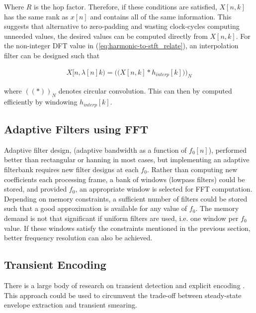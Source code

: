 \documentclass [11pt, proquest,oneside] {ganter_thesis}[2015/03/03]
\begin{document}
Where $R$ is the hop factor.  Therefore, if these conditions are satisfied, $X[n,k]$ has the same rank as $x[n]$ and contains all of the same information.  This suggests that alternative to zero-padding and wasting clock-cycles computing unneeded values, the desired values can be computed directly from $X[n,k]$.  For the non-integer DFT value in (\ref{eq:harmonic-to-stft_relate}), an interpolation filter can be designed such that 

\begin{align}
X[n, \lambda[n]k)  = \Big(\Big(X[n,k] * h_{interp}[k]\Big)\Big)_N
\end{align}

where $((*))_N$ denotes circular convolution.  This can then by computed efficiently by windowing $h_{interp}[k]$.


\subsection{Adaptive Filters using FFT}

Adaptive filter design, (adaptive bandwidth as a function of $f_0[n]$), performed better than rectangular or hanning in most cases, but implementing an adaptive filterbank requires new filter designs at each $f_0$.  Rather than computing new coefficients each processing frame, a bank of windows (lowpass filters) could be stored, and provided $f_0$, an appropriate window is selected for FFT computation.  Depending on memory constraints, a sufficient number of filters could be stored such that a good approximation is available for any value of $f_0$.  The memory demand is not that significant if uniform filters are used, i.e. one window per $f_0$ value.  If these windows satisfy the constraints mentioned in the previous section, better frequency resolution can also be achieved.

\subsection{Transient Encoding}

There is a large body of research on transient detection and explicit encoding \cite{bonada2000automatic}\cite{levine1998sines}\cite{masri1996computer}\cite{masri1996improved} .  This approach could be used to circumvent the trade-off between steady-state envelope extraction and transient smearing.
\end{document}
